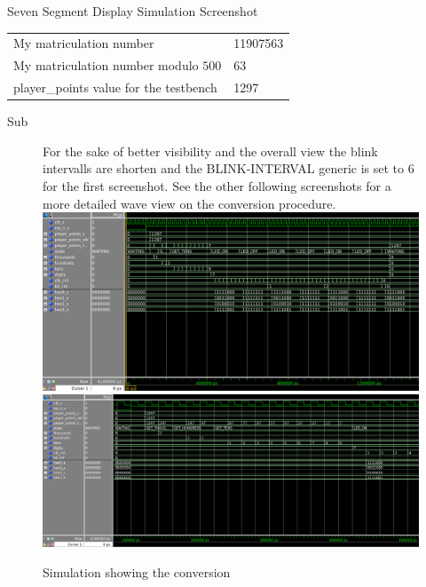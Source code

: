 \documentclass[10pt,a4paper,titlepage,oneside]{article}
\begin{document}
\begin{qa}{Seven Segment Display Simulation Screenshot}

\begin{center}
\begin{tabular}{ll}
\hline\hline
My matriculation number                          & 11907563 \\ 
My matriculation number modulo $500$             & 63 \\ 
\textsf{player\_points} value for the testbench  & 1297 \\ \hline
\end{tabular}
\end{center}
Sub
\begin{figure}[h!]
	\centering
	For the sake of better visibility and the overall view the blink intervalls are shorten and the BLINK-INTERVAL generic is set to 6 for the first screenshot. See the other following screenshots for a more detailed wave view on the conversion procedure.
	\includegraphics[width=1.0\linewidth]{dia/Subtask12_1.png}
	\includegraphics[width=1.0\linewidth]{dia/Subtask12_2.png}
	\caption{Simulation showing the conversion}
\end{figure}

\end{qa}
\end{document}
